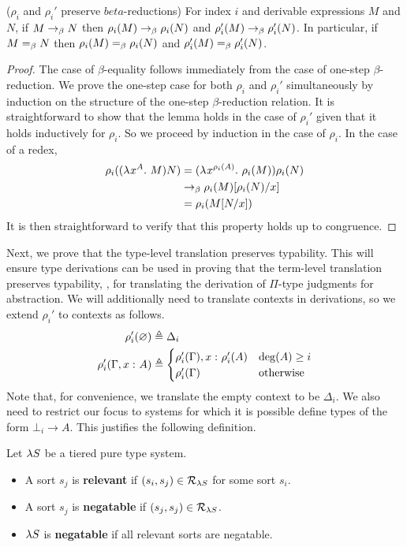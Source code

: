 \documentclass{article}
\begin{document}
\begin{lemma}
\label{lem:rho-beta}
($\rho_i$ and $\rho_i'$ preserve $beta$-reductions)
For index $i$ and derivable expressions $M$ and $N$, if $M \rightarrow_\beta N$ then $\rho_i(M) \rightarrow_\beta \rho_i(N)$ and $\rho_i'(M) \rightarrow_\beta \rho_i'(N)$.
In particular, if $M =_\beta N$ then $\rho_i(M) =_\beta \rho_i(N)$ and $\rho_i'(M) =_\beta \rho_i'(N)$.
\end{lemma}

\begin{proof}
The case of $\beta$-equality follows immediately from the case of one-step $\beta$-reduction.
We prove the one-step case for both $\rho_i$ and $\rho_i'$ simultaneously by induction on the structure of the one-step $\beta$-reduction relation.
It is straightforward to show that the lemma holds in the case of $\rho_i'$ given that it holds inductively for $\rho_i$.
So we proceed by induction in the case of $\rho_i$.
In the case of a redex,
\begin{align*}
\rho_i((\lambda^{} x^{A}. \ M)N) &=
(\lambda^{} x^{\rho_i(A)}. \ \rho_i(M)) \rho_i(N) \\ &\rightarrow_\beta
\rho_i(M)[\rho_i(N)/x] \\ &=
\rho_i(M[N/x])
\end{align*}
It is then straightforward to verify that this property holds up to congruence.
\end{proof}

Next, we prove that the type-level translation preserves typability.
This will ensure type derivations can be used in proving that the term-level translation preserves typability, \eg, for translating the derivation of $\Pi$-type judgments for abstraction. We will additionally need to translate contexts in derivations, so we extend $\rho_i'$ to contexts as follows.
\begin{align*}
\rho_i'(\varnothing) &\triangleq \Delta_i \\
\rho_i'(\Gamma, {{x} :^{} {A}}) &\triangleq
\begin{cases}
    \rho_i'(\Gamma), {{x} :^{} {\rho_i'(A)}} & \deg(A) \geq i \\
    \rho_i'(\Gamma) & \textnormal{otherwise}
\end{cases}
\end{align*}
Note that, for convenience, we translate the empty context to be $\Delta_i$.
We also need to restrict our focus to systems for which it is possible define types of the form $\bot_i \to A$.
This justifies the following definition.
\begin{definition}
Let $\lambda S$ be a tiered pure type system.
\begin{itemize}
    \item A sort $s_j$ is \textbf{relevant} if $(s_i, s_j) \in \mathcal R_{\lambda S}$ for some sort $s_i$.
    \item A sort $s_j$ is \textbf{negatable} if $(s_j, s_j) \in \mathcal R_{\lambda S}$.
    \item $\lambda S$ is \textbf{negatable} if all relevant sorts are negatable.
\end{itemize}
\end{definition}
\end{document}
